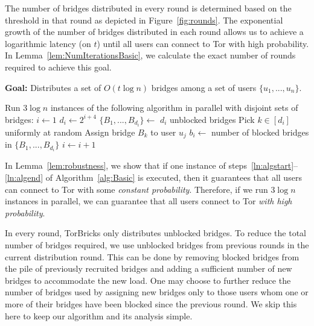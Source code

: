 \documentclass[a4paper,UKenglish]{lipics-v2016}
\newcommand{\algFont}{\fontsize{10}{13}\selectfont}
\newcommand{\bricks}{}
\def\bricks/{\mbox{TorBricks}}
\begin{document}
The number of bridges distributed in every round is determined based on the threshold in that round as depicted in Figure~\ref{fig:rounds}. The exponential growth of the number of bridges distributed in each round allows us to achieve a logarithmic latency (on $t$) until all users can connect to Tor with high probability. In Lemma~\ref{lem:NumIterationsBasic}, we calculate the exact number of rounds required to achieve this goal.
\begin{algorithm}[t]
	\caption{\bricks/ -- Basic Algorithm}
	\label{alg:Basic}
	\vspace{0.4em}
	\textbf{Goal:} Distributes a set of $O(t\log{n})$ bridges among a set of users $\{u_1,...,u_n\}$.
	
	\algFont \vspace{2pt}
	\begin{algorithmic}[1]
		\Statex \hspace{-\algorithmicindent} Run $3\log{n}$ instances of the following algorithm in parallel with disjoint sets of bridges:
		\State ${i \gets 1}$  \label{ln:algstart}
		\While{\True}
			\State $d_i \gets 2^{i+4}$	\label{ln:forparallel} \label{ln:ifreasonable}
				\State $\{B_1,...,B_{d_i}\} \gets$ $d_i$ unblocked bridges \label{ln:RecruitBridges}						
					
					\State Pick $k \in [d_i]$ uniformly at random 
					\State Assign bridge $B_{k}$ to user $u_j$				
				\EndFor			\label{ln:IterationEnd}
			 \label{ln:ConditionSimple} 
				\State $b_i \gets$ number of blocked bridges in $\{B_1, ..., B_{d_i}\}$
			\EndWhile
			\State $i \gets i+1$ \label{ln:IncrementSimple}
		\EndWhile	\label{ln:algend}
	\end{algorithmic}	
\end{algorithm}
In Lemma~\ref{lem:robustness}, we show that if one instance of steps~\ref{ln:algstart}--\ref{ln:algend} of Algorithm~\ref{alg:Basic} is executed, then it guarantees that all users can connect to Tor with some \emph{constant probability}. Therefore, if we run $3\log{n}$ instances in parallel, we can guarantee that all users connect to Tor \emph{with high probability}.

In every round, \bricks/ only distributes unblocked bridges. To reduce the total number of bridges required, we use unblocked bridges from previous rounds in the current distribution round. This can be done by removing blocked bridges from the pile of previously recruited bridges and adding a sufficient number of new bridges to accommodate the new load. One may choose to further reduce the number of bridges used by assigning new bridges only to those users whom one or more of their bridges have been blocked since the previous round. We skip this here to keep our algorithm and its analysis simple.
\end{document}
